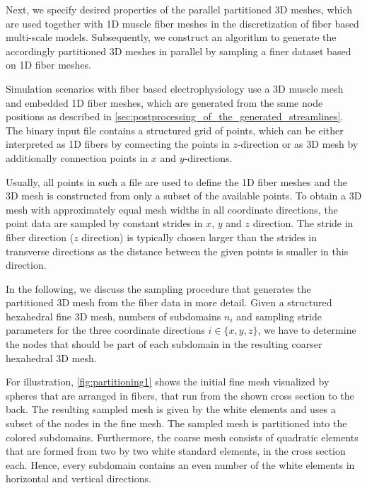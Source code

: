Next, we specify desired properties of the parallel partitioned 3D meshes, which are used together with 1D muscle fiber meshes in the discretization of fiber based multi-scale models. Subsequently, we construct an algorithm to generate the accordingly partitioned 3D meshes in parallel by sampling a finer dataset based on 1D fiber meshes.

Simulation scenarios with fiber based electrophysiology use a 3D muscle mesh and embedded 1D fiber meshes, which are generated from the same node positions as described in \cref{sec:postprocessing_of_the_generated_streamlines}. The binary input file contains a structured grid of points, which can be either interpreted as 1D fibers by connecting the points in $z$-direction or as 3D mesh by additionally connection points in $x$ and $y$-directions.

Usually, all points in such a file are used to define the 1D fiber meshes and the 3D mesh is constructed from only a subset of the available points. To obtain a 3D mesh with approximately equal mesh widths in all coordinate directions, the point data are sampled by constant strides in $x$, $y$ and $z$ direction.  The stride in fiber direction ($z$ direction) is typically chosen larger than the strides in transverse directions as the distance between the given points is smaller in this direction.

In the following, we discuss the sampling procedure that generates the partitioned 3D mesh from the fiber data in more detail.
Given a structured hexahedral fine 3D mesh, numbers of subdomains $n_i$ and sampling stride parameters  for the three coordinate directions $i\in\{x,y,z\}$, we have to determine the nodes that should be part of each subdomain in the resulting coarser hexahedral 3D mesh. 

For illustration, \cref{fig:partitioning1} shows the initial fine mesh visualized by spheres that are arranged in fibers, that run from the shown cross section to the back. The resulting sampled mesh is given by the white elements and uses a subset of the nodes in the fine mesh. The sampled mesh is partitioned into the colored subdomains. 
Furthermore, the coarse mesh consists of quadratic elements that are formed from two by two white standard elements, in the cross section each. Hence, every subdomain contains an even number of the white elements in horizontal and vertical directions.

